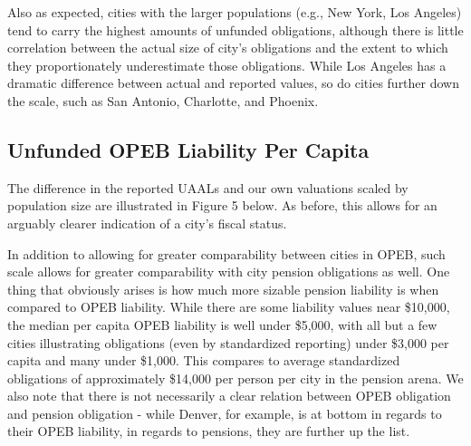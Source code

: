 \documentclass[12pt]{article}
\begin{document}
Also as expected, cities with the larger populations (e.g., New York, Los
Angeles) tend to carry the highest amounts of unfunded obligations,
although there is little correlation between the actual size of city's
obligations and the extent to which they proportionately underestimate
those obligations. While Los Angeles has a dramatic difference between
actual and reported values, so do cities further down the scale, such as
San Antonio, Charlotte, and Phoenix. 

\subsection{Unfunded OPEB Liability Per
Capita}

The difference in the reported UAALs and our own valuations scaled by
population size are illustrated in Figure 5 below. As before, this
allows for an arguably clearer indication of a city's fiscal status.

In addition to allowing for greater comparability between cities in
OPEB, such scale allows for greater comparability with city pension
obligations as well. One thing that obviously arises is how much more
sizable pension liability is when compared to OPEB liability. While there are some
liability values near \$10,000, the median per capita OPEB liability is
well under \$5,000, with all but a few cities illustrating obligations
(even by standardized reporting) under \$3,000 per capita and many under
\$1,000. This compares to average standardized obligations of approximately \$14,000 per person per city in the pension arena. We also note that there is not
necessarily a clear relation between OPEB obligation and pension
obligation - while Denver, for example, is at bottom in regards to
their OPEB liability, in regards to pensions, they are further up the
list.


\begin{figure}
  \label{fig:key}
\end{figure}
\end{document}
